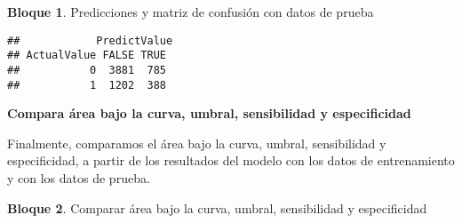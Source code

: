 \documentclass[
]{book}
\newenvironment{Shaded}{\begin{snugshade}}{\end{snugshade}}
\newcommand{\AttributeTok}[1]{\textcolor[rgb]{0.77,0.63,0.00}{#1}}
\newcommand{\FunctionTok}[1]{\textcolor[rgb]{0.00,0.00,0.00}{#1}}
\newcommand{\NormalTok}[1]{#1}
\newcommand{\OtherTok}[1]{\textcolor[rgb]{0.56,0.35,0.01}{#1}}
\newcommand{\SpecialCharTok}[1]{\textcolor[rgb]{0.00,0.00,0.00}{#1}}
\newcommand{\StringTok}[1]{\textcolor[rgb]{0.31,0.60,0.02}{#1}}
\theoremstyle{definition}
\theoremstyle{definition}
\newtheorem{example}{Bloque}[chapter]
\theoremstyle{definition}
\theoremstyle{definition}
\theoremstyle{remark}
\begin{document}
\begin{example}
\protect\hypertarget{exm:bloque90nbm}{}\label{exm:bloque90nbm}Predicciones y matriz de confusión con datos de prueba
\end{example}

\begin{Shaded}
\end{Shaded}

\begin{verbatim}
##            PredictValue
## ActualValue FALSE TRUE
##           0  3881  785
##           1  1202  388
\end{verbatim}

\textbf{Compara área bajo la curva, umbral, sensibilidad y especificidad}

Finalmente, comparamos el área bajo la curva, umbral, sensibilidad y especificidad, a partir de los resultados del modelo con los datos de entrenamiento y con los datos de prueba.

\begin{example}
\protect\hypertarget{exm:bloque91nbm}{}\label{exm:bloque91nbm}Comparar área bajo la curva, umbral, sensibilidad y especificidad
\end{example}

\begin{Shaded}
\end{Shaded}
\end{document}
